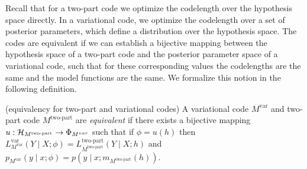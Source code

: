 Recall that for a two-part code we optimize the codelength over the hypothesis space directly. In a variational code, we optimize the codelength over a set of posterior parameters, which define a distribution over the hypothesis space. The codes are equivalent if we can establish a bijective mapping between the hypothesis space of a two-part code and the posterior parameter space of a variational code, such that for these corresponding values the codelengths are the same and the model functions are the same. We formalize this notion in the following definition.

\begin{defn} (equivalency for two-part and variational codes)
A variational code $M^{\text{var}}$ and two-part code $M^{\text{two-part}}$ are \emph{equivalent} if there exists a bijective mapping $u : {\mathcal{H}}_{M^{\text{two-part}}} \rightarrow \Phi_{M^{var}}$ such that if $\phi = u(h)$ then $L^{\text{var}}_{M^{\text{var}}}(Y \mid X;\phi) = L^{\text{two-part}}_{M^{\text{two-part}}}(Y \mid X;h)$ and $p_{M^{\text{var}}}(y \mid x;\phi) = p(y \mid x;m_{M^{\text{two-part}}}(h))$.
\end{defn}

